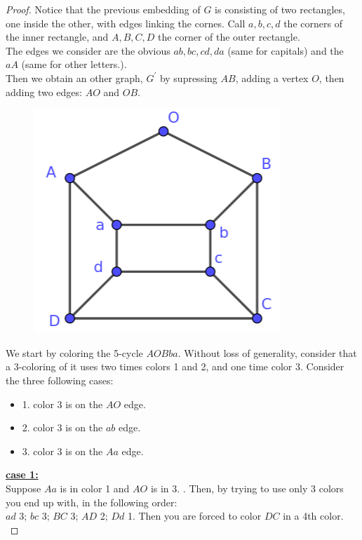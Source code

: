 \documentclass[12pt]{article}
\begin{document}
\begin{proof}
    Notice that the previous embedding of $G$ is consisting of two rectangles, one inside the other, with edges linking the cornes. 
    Call $a, b, c, d$ the corners of the inner rectangle, and $A, B, C, D$ the corner of the outer rectangle.\\
    The edges we consider are the obvious $ab, bc, cd, da$ (same for capitals) and the $aA$ (same for other letters.).\\
    Then we obtain an other graph, $G^'$ by supressing $AB$, adding a vertex $O$, then adding two edges: $AO$ and $OB$.\\

    \begin{figure}[h]
        \centering
        \includegraphics[scale=0.4]{tex_images/Gprime_uncolored.png}
    \end{figure}

    We start by coloring the 5-cycle $AOBba$. Without loss of generality, consider that a 3-coloring of it uses two times colors 1 and 2, and one time color 3. Consider the three following cases:
    \begin{itemize}
        \item 1. color 3 is on the $AO$ edge.
        \item 2. color 3 is on the $ab$ edge.
        \item 3. color 3 is on the $Aa$ edge.
    \end{itemize}

    \textbf{\underline{case 1:}} \\
    Suppose $Aa$ is in color 1 and $AO$ is in 3.  . Then, by trying to use only 3 colors you end up with, in the following order: \\
    $ad$ 3; $bc$ 3; $BC$ 3; $AD$ 2; $Dd$ 1. Then you are forced to color $DC$ in a 4th color. \\


\end{proof}
\end{document}
